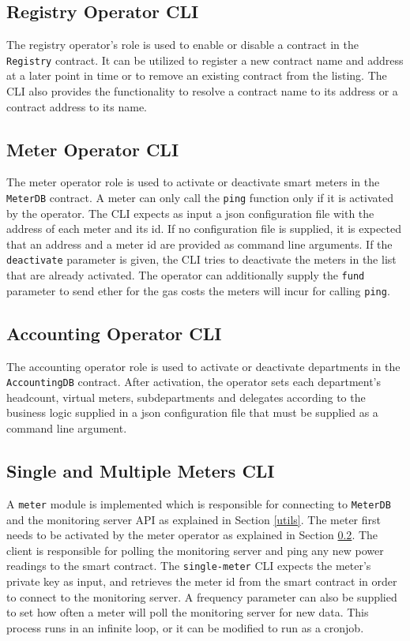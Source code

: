 \subsection{Registry Operator CLI}
The registry operator's role is used to enable or disable a contract in the \texttt{Registry} contract. It can be utilized to register a new contract name and address at a later point in time or to remove an existing contract from the listing. The CLI also provides the functionality to resolve a contract name to its address or a contract address to its name. 

\subsection{Meter Operator CLI} \label{meter-operator}
The meter operator role is used to activate or deactivate smart meters in the \texttt{MeterDB} contract. A meter can only call the \texttt{ping} function only if it is activated by the operator. The CLI expects as input a json configuration file with the address of each meter and its id. If no configuration file is supplied, it is expected that an address and a meter id are provided as command line arguments. If the \texttt{deactivate} parameter is given, the CLI tries to deactivate the meters in the list that are already activated. The operator can additionally supply the \texttt{fund} parameter to send ether for the gas costs the meters will incur for calling \texttt{ping}.

\subsection{Accounting Operator CLI}
The accounting operator role is used to activate or deactivate departments in the \texttt{AccountingDB} contract. After activation, the operator sets each department's headcount, virtual meters, subdepartments and delegates according to the business logic supplied in a json configuration file that must be supplied as a command line argument.

\subsection{Single and Multiple Meters CLI}

A \texttt{meter} module is implemented which is responsible for connecting to \texttt{MeterDB} and the monitoring server API as explained in Section \ref{utils}. The meter first needs to be activated by the meter operator as explained in Section \ref{meter-operator}. The client is responsible for polling the monitoring server and ping any new power readings to the smart contract. The \texttt{single-meter} CLI expects the meter's private key as input, and retrieves the meter id from the smart contract in order to connect to the monitoring server. A frequency parameter can also be supplied to set how often a meter will poll the monitoring server for new data. This process runs in an infinite loop, or it can be modified to run as a cronjob.

